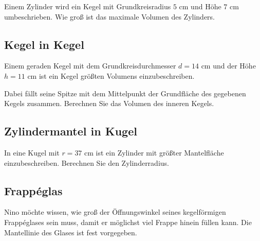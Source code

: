 Einem Zylinder wird ein Kegel mit Grundkreisradius $5 \text{ cm}$ und
Höhe $7 \text{ cm}$ umbeschrieben. Wie groß ist das maximale Volumen
des Zylinders.





\subsection{Kegel in Kegel}
Einem geraden Kegel mit dem Grundkreisdurchmesser $d = 14 \text{ cm}$ und der
Höhe $h = 11 \text{ cm}$
ist ein Kegel größten Volumens einzubeschreiben.

Dabei fällt seine Spitze mit dem Mittelpunkt der Grundfläche des
gegebenen Kegels zusammen.
Berechnen Sie das Volumen des inneren Kegels.





\subsection{Zylindermantel in Kugel}
In eine Kugel mit $r = 37 \text{ cm}$ ist ein Zylinder mit größter
Mantelfläche einzubeschreiben.
Berechnen Sie den Zylinderradius.


\subsection{Frappéglas}

Nino möchte wissen, wie groß der Öffnungswinkel seines kegelförmigen
Frappéglases sein muss, damit er möglichst viel Frappe hinein füllen
kann. Die Mantellinie des Glases ist fest vorgegeben.


